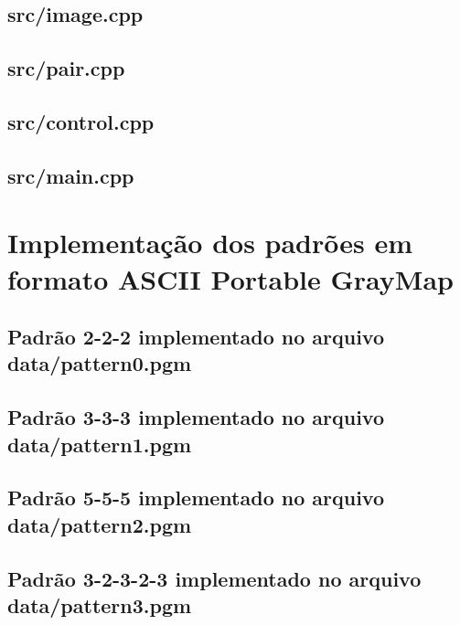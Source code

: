 \subsection{src/image.cpp}

\subsection{src/pair.cpp}

\subsection{src/control.cpp}

\subsection{src/main.cpp}



\label{pattern}

\section{Implementação dos padrões em formato ASCII Portable GrayMap}
\subsection{Padrão 2-2-2 implementado no arquivo data/pattern0.pgm}

\subsection{Padrão 3-3-3 implementado no arquivo data/pattern1.pgm}

\subsection{Padrão 5-5-5 implementado no arquivo data/pattern2.pgm}

\subsection{Padrão 3-2-3-2-3 implementado no arquivo data/pattern3.pgm}


